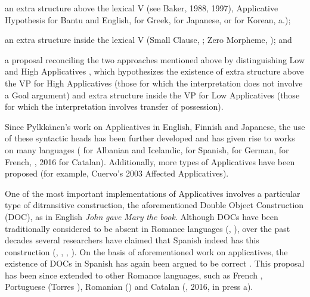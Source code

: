 \documentclass[output=paper,modfonts,nonflat]{langsci/langscibook}
\begin{document}
\begin{listWWviiiNumileveli}
\item \begin{styleBodyA}
an extra structure above the lexical V (see Baker, 1988, 1997),  Applicative Hypothesis for Bantu and English, \citet{Anagnostopoulou2003} for Greek, \citet{MiyagawaTsujioka2004} for Japanese, or \citet{MiyagawaJung2004} for Korean, a.); 
\end{styleBodyA}
\item \begin{styleBodyA}
 an extra structure inside the lexical V (Small Clause, \citealt{Kayne1984}; Zero Morpheme, \citealt{Pesetsky1995}); and
\end{styleBodyA}
\item \begin{styleBodyA}
a proposal reconciling the two approaches mentioned above by distinguishing Low and High Applicatives \citep{Pylkkänen2002}, which hypothesizes the existence of extra structure above the VP for High Applicatives (those for which the interpretation does not involve a Goal argument) and extra structure inside the VP for Low Applicatives (those for which the interpretation involves transfer of possession). 
\end{styleBodyA}
\end{listWWviiiNumileveli}
\begin{stylePrrafodelista}
\textmd{Since Pylkkänen's work on Applicatives in English, Finnish and Japanese, the use of these syntactic heads has been further developed and has given rise to works on many languages (\citealt{McGinnis2001} for Albanian and Icelandic, \citealt{Cuervo2003} for Spanish, \citealt{McIntyre2006} for German, \citealt{Fournier2010} for French, \citealt{Pineda2013}, 2016 for Catalan). Additionally, more types of Applicatives have been proposed (for example, Cuervo’s 2003 Affected Applicatives).~}
\end{stylePrrafodelista}

\begin{stylePrrafodelista}
\textmd{One of the most important implementations of Applicatives involves a particular type of ditransitive construction, the aforementioned Double Object Construction (DOC), as in English} \textmd{\textit{John} \textit{gave} \textit{Mary} \textit{the} \textit{book}}\textmd{. Although DOCs have been traditionally considered to be absent in Romance languages (\citealt{Kayne1984}, \citealt{HolmbergPlatzack1995}), over the past decades several researchers have claimed that Spanish indeed has this construction (\citealt{Masullo1992}, \citealt{Demonte1995}, \citealt{Romero1997}, \citealt{Bleam2003}). On the basis of  aforementioned work on applicatives, the existence of DOCs in Spanish has again been argued to be correct \citep{Cuervo2003}. This proposal has been since extended to other Romance languages, such as French \citep{Fournier2010}, Portuguese (Torres \citealt{MoraisSalles2010}), Romanian (\citealt{DiaconescuRivero2007}) and Catalan (\citealt{Pineda2013}, 2016, in press a).} 
\end{stylePrrafodelista}
\end{document}
